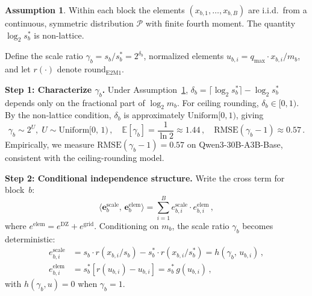 \documentclass{article}
\theoremstyle{definition}
\newtheorem{assumption}[theorem]{Assumption}
\theoremstyle{remark}
\newcommand{\Expect}{\mathbb{E}}
\newcommand{\cP}{\mathcal{P}}
\newcommand{\be}{\bm{e}}
\newcommand{\inner}[2]{\langle #1,\, #2 \rangle}
\begin{document}
\begin{assumption}
\label{assum:A}
Within each block the elements $(x_{b,1}, \ldots, x_{b,B})$ are i.i.d.\ from a continuous, symmetric distribution $\cP$ with finite fourth moment. The quantity $\log_2 s_b^*$ is non-lattice.
\end{assumption}

Define the scale ratio $\gamma_b = s_b/s_b^* = 2^{\delta_b}$, normalized elements $u_{b,i} = q_{\max}\cdot x_{b,i}/m_b$, and let $r(\cdot)$ denote $\mathrm{round}_{\mathrm{E2M1}}$.

\textbf{Step 1: Characterize $\gamma_b$.}\;
Under Assumption~\ref{assum:A}, $\delta_b = \lceil\log_2 s_b^*\rceil - \log_2 s_b^*$ depends only on the fractional part of $\log_2 m_b$. For ceiling rounding, $\delta_b \in [0, 1)$. By the non-lattice condition, $\delta_b$ is approximately $\mathrm{Uniform}[0, 1)$, giving
\begin{equation}
\label{eq:app_gamma_dist}
  \gamma_b \sim 2^U,\; U \sim \mathrm{Uniform}[0,\, 1)\,,
  \quad
  \Expect[\gamma_b] = \frac{1}{\ln 2} \approx 1.44\,,
  \quad
  \mathrm{RMSE}(\gamma_b {-} 1) \approx 0.57\,.
\end{equation}
Empirically, we measure $\mathrm{RMSE}(\gamma_b {-} 1) = 0.57$ on Qwen3-30B-A3B-Base, consistent with the ceiling-rounding model.

\textbf{Step 2: Conditional independence structure.}\;
Write the cross term for block~$b$:
\begin{equation}
  \inner{\be_b^{\mathrm{scale}}}{\be_b^{\mathrm{elem}}}
  = \sum_{i=1}^B e_{b,i}^{\mathrm{scale}} \cdot e_{b,i}^{\mathrm{elem}}\,,
\end{equation}
where $e^{\mathrm{elem}} = e^{\mathrm{DZ}} + e^{\mathrm{grid}}$. Conditioning on $m_b$, the scale ratio $\gamma_b$ becomes deterministic:
\begin{align}
  e_{b,i}^{\mathrm{scale}} &= s_b \cdot r(x_{b,i}/s_b) - s_b^* \cdot r(x_{b,i}/s_b^*)
                           = h(\gamma_b,\, u_{b,i})\,, \\
  e_{b,i}^{\mathrm{elem}}  &= s_b^* [r(u_{b,i}) - u_{b,i}]
                           = s_b^*\, g(u_{b,i})\,,
\end{align}
with $h(\gamma_b, u) = 0$ when $\gamma_b = 1$.
\end{document}

